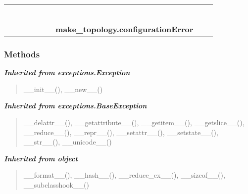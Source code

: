     \label{make_topology:configurationError}
\begin{tabular}{cccccccccc}
\multicolumn{2}{r}{\settowidth{\BCL}{object}\multirow{2}{\BCL}{object}}
&&
&&
&&
  \\\cline{3-3}
  &&\multicolumn{1}{c|}{}
&&
&&
&&
  \\
\multicolumn{4}{r}{\settowidth{\BCL}{exceptions.BaseException}\multirow{2}{\BCL}{exceptions.BaseException}}
&&
&&
  \\\cline{5-5}
  &&&&\multicolumn{1}{c|}{}
&&
&&
  \\
\multicolumn{6}{r}{\settowidth{\BCL}{exceptions.Exception}\multirow{2}{\BCL}{exceptions.Exception}}
&&
  \\\cline{7-7}
  &&&&&&\multicolumn{1}{c|}{}
&&
  \\
&&&&&&\multicolumn{2}{l}{\textbf{make\_topology.configurationError}}
\end{tabular}



  \subsubsection{Methods}


\large{\textbf{\textit{Inherited from exceptions.Exception}}}

\begin{quote}
\_\_init\_\_(), \_\_new\_\_()
\end{quote}

\large{\textbf{\textit{Inherited from exceptions.BaseException}}}

\begin{quote}
\_\_delattr\_\_(), \_\_getattribute\_\_(), \_\_getitem\_\_(), \_\_getslice\_\_(), \_\_reduce\_\_(), \_\_repr\_\_(), \_\_setattr\_\_(), \_\_setstate\_\_(), \_\_str\_\_(), \_\_unicode\_\_()
\end{quote}

\large{\textbf{\textit{Inherited from object}}}

\begin{quote}
\_\_format\_\_(), \_\_hash\_\_(), \_\_reduce\_ex\_\_(), \_\_sizeof\_\_(), \_\_subclasshook\_\_()
\end{quote}

